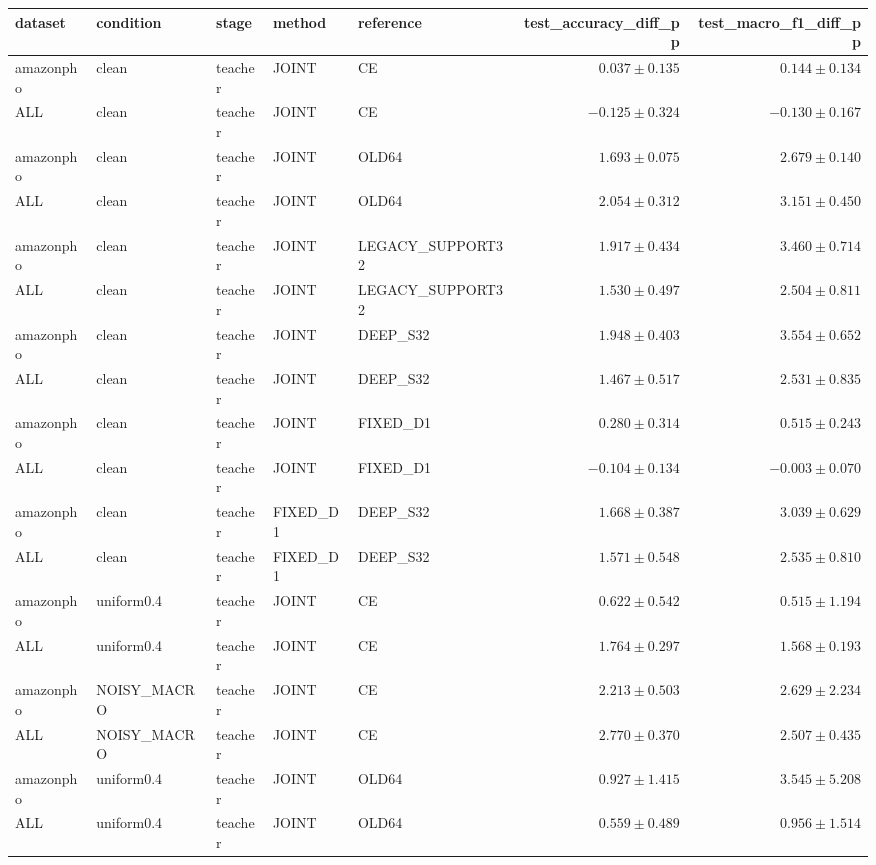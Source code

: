 \begin{longtable}{lllllrr}
dataset & condition & stage & method & reference & test\_accuracy\_diff\_pp & test\_macro\_f1\_diff\_pp \\
\hline
amazonpho & clean & teacher & JOINT & CE & $0.037 \pm 0.135$ & $0.144 \pm 0.134$ \\
ALL & clean & teacher & JOINT & CE & $-0.125 \pm 0.324$ & $-0.130 \pm 0.167$ \\
amazonpho & clean & teacher & JOINT & OLD64 & $1.693 \pm 0.075$ & $2.679 \pm 0.140$ \\
ALL & clean & teacher & JOINT & OLD64 & $2.054 \pm 0.312$ & $3.151 \pm 0.450$ \\
amazonpho & clean & teacher & JOINT & LEGACY\_SUPPORT32 & $1.917 \pm 0.434$ & $3.460 \pm 0.714$ \\
ALL & clean & teacher & JOINT & LEGACY\_SUPPORT32 & $1.530 \pm 0.497$ & $2.504 \pm 0.811$ \\
amazonpho & clean & teacher & JOINT & DEEP\_S32 & $1.948 \pm 0.403$ & $3.554 \pm 0.652$ \\
ALL & clean & teacher & JOINT & DEEP\_S32 & $1.467 \pm 0.517$ & $2.531 \pm 0.835$ \\
amazonpho & clean & teacher & JOINT & FIXED\_D1 & $0.280 \pm 0.314$ & $0.515 \pm 0.243$ \\
ALL & clean & teacher & JOINT & FIXED\_D1 & $-0.104 \pm 0.134$ & $-0.003 \pm 0.070$ \\
amazonpho & clean & teacher & FIXED\_D1 & DEEP\_S32 & $1.668 \pm 0.387$ & $3.039 \pm 0.629$ \\
ALL & clean & teacher & FIXED\_D1 & DEEP\_S32 & $1.571 \pm 0.548$ & $2.535 \pm 0.810$ \\
amazonpho & uniform0.4 & teacher & JOINT & CE & $0.622 \pm 0.542$ & $0.515 \pm 1.194$ \\
ALL & uniform0.4 & teacher & JOINT & CE & $1.764 \pm 0.297$ & $1.568 \pm 0.193$ \\
amazonpho & NOISY\_MACRO & teacher & JOINT & CE & $2.213 \pm 0.503$ & $2.629 \pm 2.234$ \\
ALL & NOISY\_MACRO & teacher & JOINT & CE & $2.770 \pm 0.370$ & $2.507 \pm 0.435$ \\
amazonpho & uniform0.4 & teacher & JOINT & OLD64 & $0.927 \pm 1.415$ & $3.545 \pm 5.208$ \\
ALL & uniform0.4 & teacher & JOINT & OLD64 & $0.559 \pm 0.489$ & $0.956 \pm 1.514$ \\

\end{longtable}
